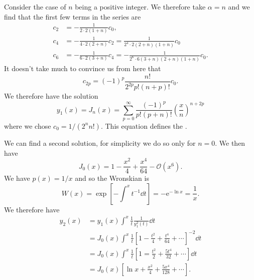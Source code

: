\documentclass[fleqn]{NotesClass}
\newcommand*{\e}{\mathrm{e}}
\newcommand*{\order}{\mathcal{O}}
\begin{document}
\begin{exm}{}{}
        Consider the case of \(n\) being a positive integer.
        We therefore take \(\alpha = n\) and we find that the first few terms in the series are
        \begin{align}
            c_2 &= - \frac{1}{2\cdot 2 (1 + n)}c_0,\\
            c_4 &= -\frac{1}{4\cdot 2(2 + n)}c_2 = \frac{1}{2^4\cdot 2(2 + n)(1 + n)}c_0\\
            c_6 &= -\frac{1}{6\cdot 2(3 + n)}c_4 = -\frac{1}{2^6\cdot 6 (3 + n)(2 + n)(1 + n)}c_0.
        \end{align}
        It doesn't take much to convince us from here that
        \begin{equation}
            c_{2p} = (-1)^p \frac{n!}{2^{2p}p!(n + p)!}c_0.
        \end{equation}
        We therefore have the solution
        \begin{equation}
            y_1(x) = J_n(x) = \sum_{p=0}^{\infty} \frac{(-1)^p}{p!(p + n)!} \left( \frac{x}{n} \right)^{n+2p}
        \end{equation}
        where we chose \(c_0 = 1/(2^nn!)\).
        This equation defines the .
        
        We can find a second solution, for simplicity we do so only for \(n = 0\).
        We then have
        \begin{equation}
            J_0(x) = 1 - \frac{x^2}{4} + \frac{x^4}{64} - \order(x^6).
        \end{equation}
        We have \(p(x) = 1/x\) and so the Wronskian is
        \begin{equation}
            W(x) = \exp\left[ -\int^x t^{-1} \dd{t} \right] = -\e^{-\ln x} = \frac{1}{x}.
        \end{equation}
        We therefore have
        \begin{align}
            y_2(x) &= y_1(x) \int^x \frac{1}{t}\frac{1}{y_1^2(t)} \dd{t}\\
            &= J_0(x) \int^x \frac{1}{t}\left[ 1 - \frac{t^2}{4} + \frac{t^4}{64} + \dotsb \right]^{-2}\dd{t}\\
            &= J_0(x) \int^x \frac{1}{t} \left[ 1 = \frac{t^2}{2} + \frac{5t^4}{32} + \dotsb \right] \dd{t}\\
            &= J_0(x) \left[ \ln x + \frac{x^2}{4} + \frac{5x^{4}}{128} + \dotsb \right].
        \end{align}
    \end{exm}
    
\end{document}
